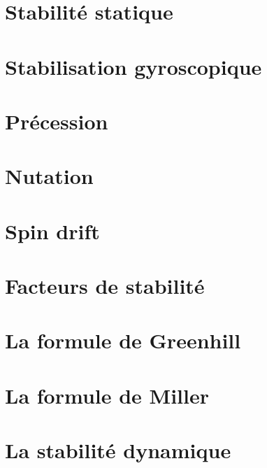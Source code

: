     \chapter{Stabilité statique}
    \label{chap:stabilite_statique}
    

    \chapter{Stabilisation gyroscopique}
    \label{chap:stabilisation_gyroscopique}
    

    \chapter{Précession}
    \label{chap:precession}
    

    \chapter{Nutation}
    \label{chap:nutation}
    

    \chapter{Spin drift}
    \label{chap:spin_drift}
    

    \chapter{Facteurs de stabilité}
    \label{chap:facteurs_stabilite}
    

    \chapter{La formule de Greenhill}
    \label{chap:formule_greenhill}
    

    \chapter{La formule de Miller}
    \label{chap:formule_miller}
    

    \chapter{La stabilité dynamique}
    \label{chap:stabilite_dynamique}
    
